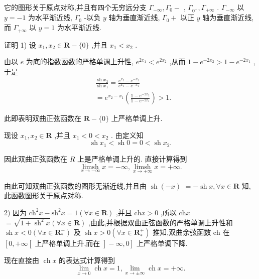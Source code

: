 它的图形关于原点对称,并且有四个无穷远分支 ${\Gamma }_{-\infty },{\Gamma }_{0} -$ , ${\Gamma }_{{0}^{ + }},{\Gamma }_{+\infty }$ . ${\Gamma }_{-\infty }$ 以 $y =  - 1$ 为水平渐近线, ${\Gamma }_{0}$ -以负 $y$ 轴为垂直渐近线, ${\Gamma }_{0} +$ 以正 $y$ 轴为垂直渐近线,而 ${\Gamma }_{+\infty }$ 以 $y = 1$ 为水平渐近线.

证明 1) 设 ${x}_{1},{x}_{2} \in  \mathbf{R} - \{ 0\}$ ,并且 ${x}_{1} < {x}_{2}$ .

由以 $e$ 为底的指数函数的严格单调上升性, ${e}^{2{x}_{1}} < {e}^{2{x}_{2}}$ ,从而 $1 - {e}^{-2{x}_{2}} > 1 - {e}^{-2{x}_{1}}$ ,于是
\begin{align*}
	&\frac{\operatorname{sh}{x}_{2}}{\operatorname{sh}{x}_{1}} = \frac{{e}^{{x}_{2}} - {e}^{-{x}_{2}}}{{e}^{{x}_{1}} - {e}^{-{x}_{1}}}\\
	&= {e}^{{x}_{2} - {x}_{1}}\left( \frac{1 - {e}^{-2{x}_{2}}}{1 - {e}^{-2{x}_{1}}}\right)  > 1.
\end{align*}

此即表明双曲正弦函数在 $\mathbf{R} - \{ 0\}$ 上严格单调上升.

现设 ${x}_{1},{x}_{2} \in  \mathbf{R}$ ,并且 ${x}_{1} < 0 < {x}_{2}$ . 由定义知
$$\operatorname{sh}{x}_{1} < \operatorname{sh}0 = 0 < \operatorname{sh}{x}_{2}.$$

因此双曲正弦函数在 $R$ 上是严格单调上升的. 直接计算得到
$$\mathop{\operatorname{limsh}}\limits_{{x \rightarrow   - \infty }}x =  - \infty ,\mathop{\operatorname{limsh}}\limits_{{x \rightarrow   + \infty }}x =  + \infty .$$

由此可知双曲正弦函数的图形无渐近线,并且由 $\operatorname{sh}\left( {-x}\right)$  $=  - \operatorname{sh}x,\forall x \in  \mathbf{R}$ 知,此函数图形关于原点对称.

2) 因为 ${\mathrm{{ch}}}^{2}x - {\mathrm{{sh}}}^{2}x = 1\left( {\forall x \in  \mathbf{R}}\right)$ ,并且 $\mathrm{{ch}}x > 0$ ,所以 $\mathrm{{ch}}x$  $= \sqrt{1 + {\operatorname{sh}}^{2}x}\left( {\forall x \in  \mathbf{R}}\right)$ ,由此,并根据双曲正弦函数的严格单调上升性和 $\operatorname{sh}x < 0\left( {\forall x \in  {\mathbf{R}}_{ * }^{ - }}\right)$ 及 $\operatorname{sh}x > 0\left( {\forall x \in  {\mathbf{R}}_{ * }^{ + }}\right)$ 推知,双曲余弦函数 $\mathrm{{ch}}$ 在 $\left\lbrack  {0, + \infty \left\lbrack  \text{ 上严格单调上升,而在 }\right\rbrack   - \infty ,0}\right\rbrack$ 上严格单调下降.

现在直接由 $\operatorname{ch}x$ 的表达式计算得到
$$\mathop{\lim }\limits_{{x \rightarrow  0}}\operatorname{ch}x = 1,\mathop{\lim }\limits_{{x \rightarrow   \pm  \infty }}\operatorname{ch}x =  + \infty .$$

